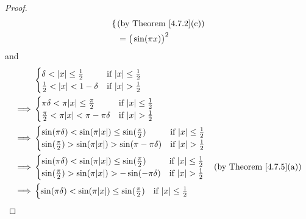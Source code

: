 \begin{proof}
\begin{align*}
\begin{cases}
                                          \end{cases} & \text{(by Theorem \ref{4.7.2}(c))} \\
                                      & = \big(\sin(\pi x)\big)^2
    \end{align*}
    and
    \begin{align*}
                 & \begin{cases}
                       \delta < \abs{x} \leq \frac{1}{2}  & \text{if } \abs{x} \leq \frac{1}{2} \\
                       \frac{1}{2} < \abs{x} < 1 - \delta & \text{if } \abs{x} > \frac{1}{2}    \\
                   \end{cases}                               \\
        \implies & \begin{cases}
                       \pi \delta < \pi \abs{x} \leq \frac{\pi}{2}    & \text{if } \abs{x} \leq \frac{1}{2} \\
                       \frac{\pi}{2} < \pi \abs{x} < \pi - \pi \delta & \text{if } \abs{x} > \frac{1}{2}    \\
                   \end{cases}                   \\
        \implies & \begin{cases}
                       \sin(\pi \delta) < \sin(\pi \abs{x}) \leq \sin(\frac{\pi}{2})    & \text{if } \abs{x} \leq \frac{1}{2} \\
                       \sin(\frac{\pi}{2}) > \sin(\pi \abs{x}) > \sin(\pi - \pi \delta) & \text{if } \abs{x} > \frac{1}{2}    \\
                   \end{cases} \\
        \implies & \begin{cases}
                       \sin(\pi \delta) < \sin(\pi \abs{x}) \leq \sin(\frac{\pi}{2}) & \text{if } \abs{x} \leq \frac{1}{2} \\
                       \sin(\frac{\pi}{2}) > \sin(\pi \abs{x}) > -\sin(-\pi \delta)  & \text{if } \abs{x} > \frac{1}{2}    \\
                   \end{cases}    & \text{(by Theorem \ref{4.7.5}(a))}    \\
        \implies & \begin{cases}
                       \sin(\pi \delta) < \sin(\pi \abs{x}) \leq \sin(\frac{\pi}{2}) & \text{if } \abs{x} \leq \frac{1}{2} \\

\end{cases}
\end{align*}
\end{proof}
